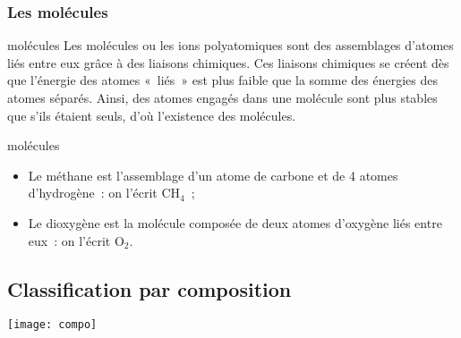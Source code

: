 \documentclass[../main/main.tex]{subfiles}
\begin{document}
\subsubsection{Les molécules}
\begin{tcbraster}[raster columns=2, raster equal height=rows]
    \begin{defi}[label=def:molécules]{molécules}
        Les molécules ou les ions polyatomiques sont des assemblages d'atomes
        liés entre eux grâce à des liaisons chimiques. Ces liaisons chimiques se
        créent dès que l'énergie des atomes «~liés~» est plus faible que la
        somme des énergies des atomes séparés. Ainsi, des atomes engagés dans
        une molécule sont plus stables que s'ils étaient seuls, d'où l'existence
        des molécules.
    \end{defi}
    \begin{exem}[label=exem:molécules]{molécules}
        \begin{itemize}
            \item Le méthane est l'assemblage d'un atome de carbone et de 4
                atomes d'hydrogène~: on l'écrit CH$_4$~;
            \item Le dioxygène est la molécule composée de deux atomes d'oxygène
                liés entre eux~: on l'écrit O$_2$.
        \end{itemize}
    \end{exem}
\end{tcbraster}

\subsection{Classification par composition}

\begin{center}
    \texttt{[image: compo]}
\end{center}
\end{document}
